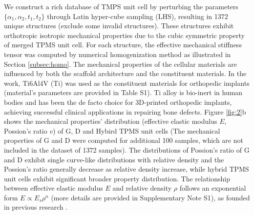 \documentclass[preprint,review,12pt,authoryear]{elsarticle}
\begin{document}
We construct a rich database of TMPS unit cell by perturbing the parameters $\{\alpha_1, \alpha_2, t_1, t_2\} $ through Latin hyper-cube sampling (LHS), resulting in 1372 unique structures (exclude some invalid structures). These structures exhibit orthotropic isotropic mechanical properties due to the cubic symmetric property of merged TPMS unit cell. For each structure, the effective mechanical stiffness tensor was computed by numerical homogenization method as illustrated in Section \ref{subsec:homo}. The mechanical properties of the cellular materials are influenced by both the scaffold architecture and the constituent materials. In the work, Ti6Al4V (Ti) was used as the constituent materials for orthopedic implants \citep{Peng2023} (material's parameters are provided in Table S1). Ti alloy is bio-inert in human bodies and has been the de facto choice for 3D-printed orthopedic implants, achieving successful clinical applications in repairing bone defects. Figure \ref{fig:2}b shows the mechanical properties' distribution (effective elastic modulus $E$, Possion's ratio $v$) of G, D and Hybird TPMS unit cells (The mechanical properties of G and D were computed for additional 100 samples, which are not included in the dataset of 1372 samples). The distributions of Possion's ratio of G and D exhibit single curve-like distributions with relative density and the Possion's ratio generally decrease as relative density increase, while hybrid TPMS unit cells exhibit significant broader property distribution. The relationship between effective elastic modulus $E$ and relative density $\rho$ follows an exponential form $E \propto E_s\rho^{n}$ (more details are provided in Supplementary Note S1), as founded in previous research \citep{Bauer2017}.
\end{document}
